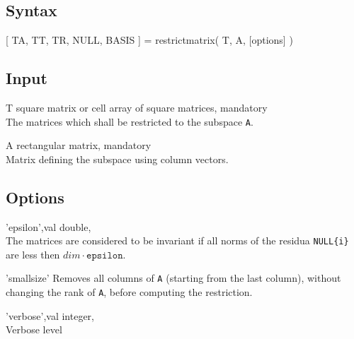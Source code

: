 \subsection*{Syntax}
\begin{param}
\item[{[ TA, TT, TR, NULL, BASIS ] = restrictmatrix( T, A, [options] )}]
\end{param}

\subsection*{Input}
\begin{param}
\item[T] square matrix or cell array of square matrices, mandatory\\
The matrices which shall be restricted to the subspace \texttt{A}.
\item[A] rectangular matrix, mandatory\\
Matrix defining the subspace using column vectors.
\end{param}


\subsection*{Options}
\begin{param}

\item['epsilon',val] double, \\The matrices are considered to be invariant if all norms of the residua \texttt{NULL\{i\}} are less then $dim\cdot\texttt{epsilon}$.

\item['smallsize'] Removes all columns of \texttt{A} (starting from the last column), without changing the rank of \texttt{A}, before computing the restriction.

\item['verbose',val] integer, \\ Verbose level
\end{param}
